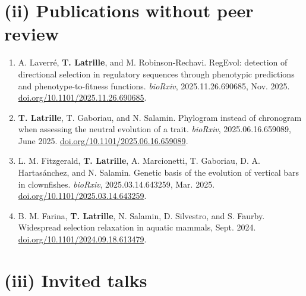 \documentclass[11pt,a4paper]{moderncv}
\begin{document}
\section*{(ii) Publications without peer review}
\begin{enumerate}
\setlength\itemsep{1em}
    \item A. Laverré, \textbf{T. Latrille}, and M. Robinson-Rechavi. RegEvol: detection of directional selection in regulatory sequences through phenotypic predictions and phenotype-to-fitness functions. \textit{bioRxiv}, 2025.11.26.690685, Nov. 2025. \href{https://doi.org/10.1101/2025.11.26.690685}{doi.org/10.1101/2025.11.26.690685}.
    \item \textbf{T. Latrille}, T. Gaboriau, and N. Salamin. Phylogram instead of chronogram when assessing the neutral evolution of a trait. \textit{bioRxiv}, 2025.06.16.659089, June 2025. \href{https://doi.org/10.1101/2025.06.16.659089}{doi.org/10.1101/2025.06.16.659089}.
    \item L. M. Fitzgerald, \textbf{T. Latrille}, A. Marcionetti, T. Gaboriau, D. A. Hartasánchez, and N. Salamin. Genetic basis of the evolution of vertical bars in clownfishes. \textit{bioRxiv}, 2025.03.14.643259, Mar. 2025. \href{https://doi.org/10.1101/2025.03.14.643259}{doi.org/10.1101/2025.03.14.643259}.
    \item B. M. Farina, \textbf{T. Latrille}, N. Salamin, D. Silvestro, and S. Faurby. Widespread selection relaxation in aquatic mammals, Sept. 2024. \href{https://doi.org/10.1101/2024.09.18.613479}{doi.org/10.1101/2024.09.18.613479}.
\end{enumerate}

\section*{(iii) Invited talks}
\end{document}
